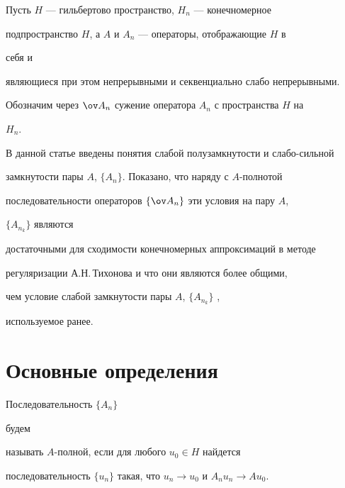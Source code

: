  


\maketitle 


\label{begin} 


 


Пусть $H$ --- гильбертово пространство, $H_n$ --- конечномерное 


подпространство $H$, а $A$ и $A_n$ --- операторы, отображающие $H$ в 


себя и 


являющиеся при этом непрерывными и секвенциально слабо непрерывными. 


Обозначим через $\ov A_n$ сужение оператора $A_n$ с пространства $H$ на 


$H_n$. 


 


В данной статье введены понятия слабой полузамкнутости и слабо-сильной 


замкнутости пары $A$, $\{A_n\}$. Показано, что наряду с $A$-полнотой 


последовательности операторов $\{\ov A_n\}$ эти условия на пару $A$, 


$\{A_{n_k}\}$ являются 


достаточными для сходимости конечномерных аппроксимаций в методе 


регуляризации А.Н.\,Тихонова \cite{1} и что они являются более общими, 


чем условие слабой замкнутости пары $A$, $\{A_{n_k}\}$ \cite{2}, 


используемое ранее. 


 


\section{Основные определения} 


 


\begin{defn} Последовательность $\{A_n\}$ 


будем 


называть $A$-полной, если для любого $u_0\in H$ найдется 


последовательность $\{u_n\}$ такая, что $u_n\to u_0$ и $A_nu_n\to Au_0$. 


\end{defn} 


